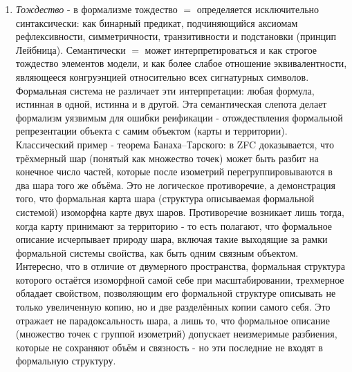 \documentclass[12pt]{article}
\begin{document}
\begin{enumerate}
    \item {\it Тождество} - в формализме тождество $=$ определяется исключительно синтаксически: как бинарный предикат, подчиняющийся аксиомам рефлексивности, симметричности, транзитивности и подстановки (принцип Лейбница). Семантически $=$ может интерпретироваться и как строгое тождество элементов модели, и как более слабое отношение эквивалентности, являющееся конгруэнцией относительно всех сигнатурных символов. Формальная система не различает эти интерпретации: любая формула, истинная в одной, истинна и в другой. Эта семантическая слепота делает формализм уязвимым для ошибки реификации - отождествления формальной репрезентации объекта с самим объектом (карты и территории). Классический пример - теорема Банаха–Тарского: в ZFC доказывается, что трёхмерный шар (понятый как множество точек) может быть разбит на конечное число частей, которые после изометрий перегруппировываются в два шара того же объёма. Это не логическое противоречие, а демонстрация того, что формальная карта шара (структура описываемая формальной системой) изоморфна карте двух шаров. Противоречие возникает лишь тогда, когда карту принимают за территорию - то есть полагают, что формальное описание исчерпывает природу шара, включая такие выходящие за рамки формальной системы свойства, как быть одним связным объектом. Интересно, что в отличие от двумерного пространства, формальная структура которого остаётся изоморфной самой себе при масштабировании, трехмерное обладает свойством, позволяющим его формальной структуре описывать не только увеличенную копию, но и две разделённых копии самого себя. Это отражает не парадоксальность шара, а лишь то, что формальное описание (множество точек с группой изометрий) допускает неизмеримые разбиения, которые не сохраняют объём и связность - но эти последние не входят в формальную структуру.

\end{enumerate}
\end{document}
